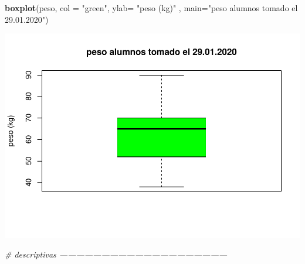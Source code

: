 \documentclass[
]{article}
\newenvironment{Shaded}{\begin{snugshade}}{\end{snugshade}}
\newcommand{\CommentTok}[1]{\textcolor[rgb]{0.56,0.35,0.01}{\textit{#1}}}
\newcommand{\DataTypeTok}[1]{\textcolor[rgb]{0.13,0.29,0.53}{#1}}
\newcommand{\KeywordTok}[1]{\textcolor[rgb]{0.13,0.29,0.53}{\textbf{#1}}}
\newcommand{\NormalTok}[1]{#1}
\newcommand{\StringTok}[1]{\textcolor[rgb]{0.31,0.60,0.02}{#1}}
\begin{document}
\begin{Shaded}
\begin{Highlighting}[]
\KeywordTok{boxplot}\NormalTok{(peso, }\DataTypeTok{col =} \StringTok{"green"}\NormalTok{, }\DataTypeTok{ylab=} \StringTok{"peso (kg)"}\NormalTok{ ,}
        \DataTypeTok{main=}\StringTok{"peso alumnos tomado el 29.01.2020"}\NormalTok{)}
\end{Highlighting}
\end{Shaded}

\includegraphics{scrip_1_files/figure-latex/unnamed-chunk-1-2.pdf}

\begin{Shaded}
\begin{Highlighting}[]
\CommentTok{# descriptivas ------------------------------------------------------------}
\end{Highlighting}
\end{Shaded}
\end{document}
